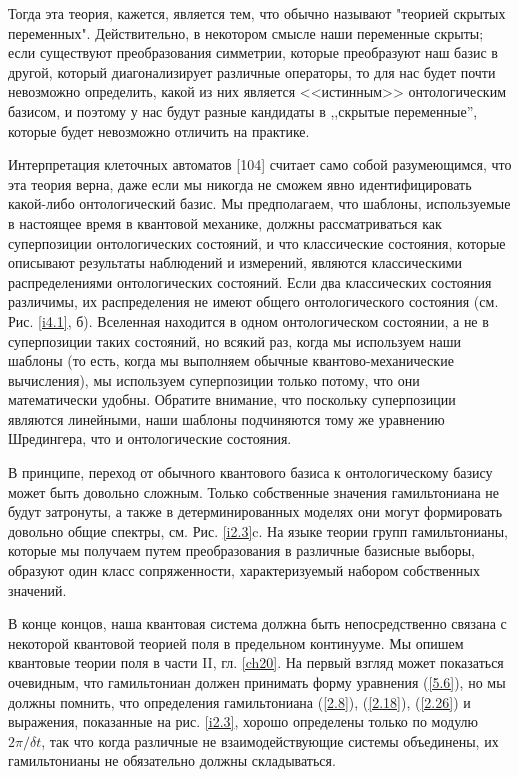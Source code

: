 \documentclass[main.tex]{subfiles}
\begin{document}
Тогда эта теория, кажется, является тем, что обычно называют "теорией скрытых переменных". Действительно, в некотором смысле наши переменные скрыты; если существуют преобразования симметрии, которые преобразуют наш базис в другой, который диагонализирует различные операторы, то для нас будет почти невозможно определить, какой из них является <<истинным>> онтологическим базисом, и поэтому у нас будут разные кандидаты в ,,скрытые переменные'', которые будет невозможно отличить на практике.

Интерпретация клеточных автоматов [104] считает само собой разумеющимся, что эта теория верна, даже если мы никогда не сможем явно идентифицировать какой-либо онтологический базис. Мы предполагаем, что шаблоны, используемые в настоящее время в квантовой механике, должны рассматриваться как суперпозиции онтологических состояний, и что классические состояния, которые описывают результаты наблюдений и измерений, являются классическими распределениями онтологических состояний. Если два классических состояния различимы, их распределения не имеют общего онтологического состояния (см. Рис. \ref{i4.1}, б). Вселенная находится в одном онтологическом состоянии, а не в суперпозиции таких состояний, но всякий раз, когда мы используем наши шаблоны (то есть, когда мы выполняем обычные квантово-механические вычисления), мы используем суперпозиции только потому, что они математически удобны. Обратите внимание, что поскольку суперпозиции являются линейными, наши шаблоны подчиняются тому же уравнению Шредингера, что и онтологические состояния.

В принципе, переход от обычного квантового базиса к онтологическому базису может быть довольно сложным. Только собственные значения гамильтониана не будут затронуты, а также в детерминированных моделях они могут формировать довольно общие спектры, см. Рис. \ref{i2.3}c. На языке теории групп гамильтонианы, которые мы получаем путем преобразования в различные базисные выборы, образуют один класс сопряженности, характеризуемый набором собственных значений.

В конце концов, наша квантовая система должна быть непосредственно связана с некоторой квантовой теорией поля в предельном континууме. Мы опишем квантовые теории поля в части II, гл. \ref{ch20}. На первый взгляд может показаться очевидным, что гамильтониан должен принимать форму уравнения (\ref{5.6}), но мы должны помнить, что определения гамильтониана (\ref{2.8}), (\ref{2.18}), (\ref{2.26}) и выражения, показанные на рис. \ref{i2.3}, хорошо определены только по модулю $2\pi/\delta t$, так что когда различные не взаимодействующие системы объединены, их гамильтонианы не обязательно должны складываться.
\end{document}
